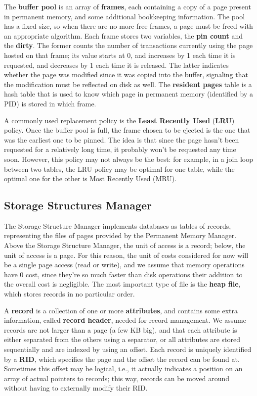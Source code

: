 The \textbf{buffer pool} is an array of \textbf{frames}, each containing a copy of a page present in permanent memory, and some additional bookkeeping information. The pool has a fixed size, so when there are no more free frames, a page must be freed with an appropriate algorithm. Each frame stores two variables, the \textbf{pin count} and the \textbf{dirty}. The former counts the number of transactions currently using the page hosted on that frame; its value starts at 0, and increases by 1 each time it is requested, and decreases by 1 each time it is released. The latter indicates whether the page was modified since it was copied into the buffer, signaling that the modification must be reflected on disk as well. The \textbf{resident pages} table is a hash table that is used to know which page in permanent memory (identified by a PID) is stored in which frame.

A commonly used replacement policy is the \textbf{Least Recently Used} (\textbf{LRU}) policy. Once the buffer pool is full, the frame chosen to be ejected is the one that was the earliest one to be pinned. The idea is that since the page hasn't been requested for a relatively long time, it probably won't be requested any time soon. However, this policy may not always be the best: for example, in a join loop between two tables, the LRU policy may be optimal for one table, while the optimal one for the other is Most Recently Used (MRU).

\subsection{Storage Structures Manager}

The Storage Structure Manager implements databases as tables of records, representing the files of pages provided by the Permanent Memory Manager. Above the Storage Structure Manager, the unit of access is a record; below, the unit of access is a page. For this reason, the unit of costs considered for now will be a single page access (read or write), and we assume that memory operations have 0 cost, since they're so much faster than disk operations their addition to the overall cost is negligible. The most important type of file is the \textbf{heap file}, which stores records in no particular order.

A \textbf{record} is a collection of one or more \textbf{attributes}, and contains some extra information, called \textbf{record header}, needed for record management. We assume records are not larger than a page (a few KB big), and that each attribute is either separated from the others using a separator, or all attributes are stored sequentially and are indexed by using an offset. Each record is uniquely identified by a \textbf{RID}, which specifies the page and the offset the record can be found at. Sometimes this offset may be logical, i.e., it actually indicates a position on an array of actual pointers to records; this way, records can be moved around without having to externally modify their RID.

